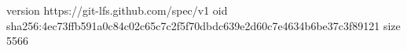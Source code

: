 version https://git-lfs.github.com/spec/v1
oid sha256:4ec73ffb591a0c84c02c65c7c2f5f70dbdc639e2d60c7e4634b6be37c3f89121
size 5566
